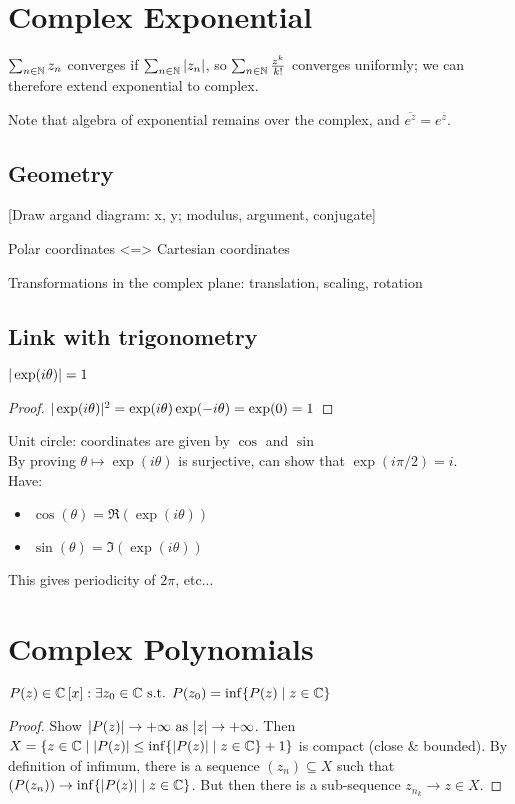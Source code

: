 \section{Complex Exponential}
$\sum_{n \in \mathbb{N}}z_n$ converges if $\sum_{n \in \mathbb{N}}| z_n |$, so $\sum_{n \in \mathbb{N}}\frac{z^k}{k!}$ converges uniformly; we can therefore extend exponential to complex.

Note that algebra of exponential remains over the complex, and $\overline{e^z}=e^{\overline{z}}$.

\subsection{Geometry}
[Draw argand diagram: x, y; modulus, argument, conjugate]

Polar coordinates <=> Cartesian coordinates

Transformations in the complex plane: translation, scaling, rotation

\subsection{Link with trigonometry}
\begin{property}
	$| \exp(i\theta) | = 1$
\end{property}
\begin{proof}
	$| \exp(i\theta) |^2 = \exp(i\theta)\exp(-i\theta) = \exp(0) = 1$
\end{proof}
Unit circle: coordinates are given by $\cos$ and $\sin$\\
By proving $\theta \mapsto \exp(i\theta)$ is surjective, can show that $\exp(i\pi/2)=i$.\\
Have:
\begin{itemize}
	\item $\cos(\theta) = \Re(\exp(i\theta))$
	\item $\sin(\theta) = \Im(\exp(i\theta))$
\end{itemize}
This gives periodicity of $2\pi$, etc...

\section{Complex Polynomials}
\begin{lemma}
	$P(z) \in \mathbb{C}\left[ x \right]: \exists z_0 \in \mathbb{C} \text{ s.t. } P(z_0) = \inf\{ P(z) \mid z \in \mathbb{C} \}$
\end{lemma}
\begin{proof}
	Show $| P(z) | \to +\infty \text{ as } | z | \to +\infty$.
	Then $X = \{ z \in \mathbb{C} \mid | P(z) | \leq \inf\{ | P(z) | \mid z \in \mathbb{C} \}+1 \}$ is compact (close \& bounded).
	By definition of infimum, there is a sequence $(z_n) \subseteq X$ such that $(P(z_n)) \to \inf\{ | P(z) | \mid z \in \mathbb{C} \}$.
	But then there is a sub-sequence $z_{n_k} \to z \in X$.
\end{proof}

